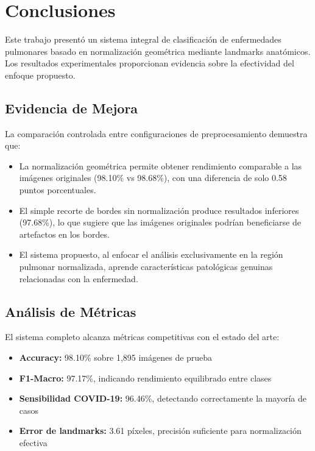 \documentclass[runningheads]{llncs}
\begin{document}
\section{Conclusiones}
\label{sec:conclusiones}

Este trabajo presentó un sistema integral de clasificación de enfermedades pulmonares basado en normalización geométrica mediante landmarks anatómicos. Los resultados experimentales proporcionan evidencia sobre la efectividad del enfoque propuesto.

\subsection{Evidencia de Mejora}

La comparación controlada entre configuraciones de preprocesamiento demuestra que:

\begin{itemize}
    \item La normalización geométrica permite obtener rendimiento comparable a las imágenes originales (98.10\% vs 98.68\%), con una diferencia de solo 0.58 puntos porcentuales.

    \item El simple recorte de bordes sin normalización produce resultados inferiores (97.68\%), lo que sugiere que las imágenes originales podrían beneficiarse de artefactos en los bordes.

    \item El sistema propuesto, al enfocar el análisis exclusivamente en la región pulmonar normalizada, aprende características patológicas genuinas relacionadas con la enfermedad.
\end{itemize}

\subsection{Análisis de Métricas}

El sistema completo alcanza métricas competitivas con el estado del arte:

\begin{itemize}
    \item \textbf{Accuracy:} 98.10\% sobre 1,895 imágenes de prueba
    \item \textbf{F1-Macro:} 97.17\%, indicando rendimiento equilibrado entre clases
    \item \textbf{Sensibilidad COVID-19:} 96.46\%, detectando correctamente la mayoría de casos
    \item \textbf{Error de landmarks:} 3.61 píxeles, precisión suficiente para normalización efectiva
\end{itemize}
\end{document}
